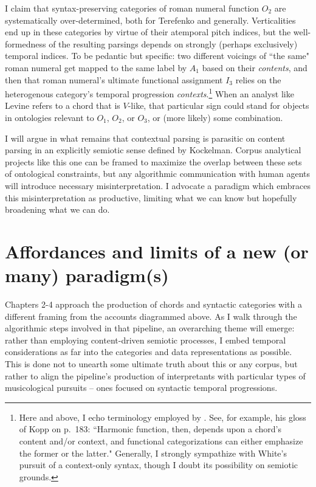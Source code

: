 I claim that syntax-preserving categories of roman numeral function $O_2$ are systematically over-determined, both for Terefenko and generally.  Verticalities end up in these categories by virtue of their atemporal pitch indices, but the well-formedness of the resulting parsings depends on strongly (perhaps exclusively) temporal indices.  To be pedantic but specific: two different voicings of ``the same" roman numeral get mapped to the same label by $A_1$ based on their \emph{contents}, and then that roman numeral's ultimate functional assignment $I_3$ relies on the heterogenous category's temporal progression \emph{contexts}.\footnote{Here and above, I echo terminology employed by \cite{white2013}.  See, for example, his gloss of Kopp on p.\ 183: ``Harmonic function, then, depends upon a chord's content and/or context, and functional categorizations can either emphasize the former or the latter."  Generally, I strongly sympathize with White's pursuit of a context-only syntax, though I doubt its possibility on semiotic grounds.}  When an analyst like Levine refers to a chord that is $V$-like, that particular sign could stand for objects in ontologies relevant to $O_1$, $O_2$, or $O_3$, or (more likely) some combination.

I will argue in what remains that contextual parsing is parasitic on content parsing in an explicitly semiotic sense defined by Kockelman.  Corpus analytical projects like this one can be framed to maximize the overlap between these sets of ontological constraints, but any algorithmic communication with human agents will introduce necessary misinterpretation.  I advocate a paradigm which embraces this misinterpretation as productive, limiting what we can know but hopefully broadening what we can do.

\section{Affordances and limits of a new (or many) paradigm(s)}

Chapters 2-4 approach the production of chords and syntactic categories with a different framing from the accounts diagrammed above.  As I walk through the algorithmic steps involved in that pipeline, an overarching theme will emerge: rather than employing content-driven semiotic processes, I embed temporal considerations as far into the categories and data representations as possible.  This is done not to unearth some ultimate truth about this or any corpus, but rather to align the pipeline's production of interpretants with particular types of musicological pursuits -- ones focused on syntactic temporal progressions.  

